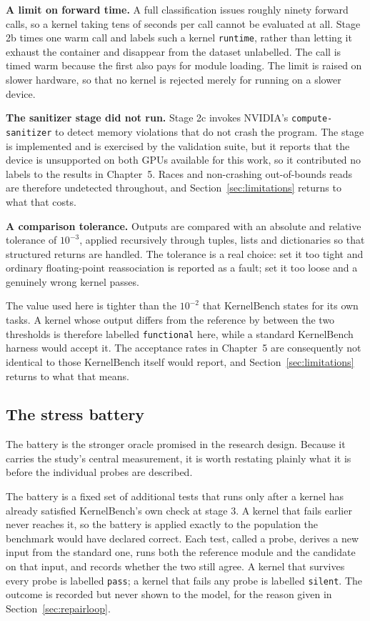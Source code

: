 \documentclass[12pt]{article}
\begin{document}
\textbf{A limit on forward time.} A full classification issues roughly ninety
forward calls, so a kernel taking tens of seconds per call cannot be evaluated
at all. Stage 2b times one warm call and labels such a kernel \texttt{runtime},
rather than letting it exhaust the container and disappear from the dataset
unlabelled. The call is timed warm because the first also pays for module
loading. The limit is raised on slower hardware, so that no kernel is rejected
merely for running on a slower device.

\textbf{The sanitizer stage did not run.} Stage 2c invokes NVIDIA's
\texttt{compute-sanitizer} to detect memory violations that do not crash the
program. The stage is implemented and is exercised by the validation suite, but
it reports that the device is unsupported on both GPUs available for this work,
so it contributed no labels to the results in Chapter~5. Races and non-crashing
out-of-bounds reads are therefore undetected throughout, and
Section~\ref{sec:limitations} returns to what that costs.

\textbf{A comparison tolerance.} Outputs are compared with an absolute and
relative tolerance of $10^{-3}$, applied recursively through tuples, lists and
dictionaries so that structured returns are handled. The tolerance is a real
choice: set it too tight and ordinary floating-point reassociation is reported
as a fault; set it too loose and a genuinely wrong kernel passes.

The value used here is tighter than the $10^{-2}$ that KernelBench states for
its own tasks. A kernel whose output differs from the reference by between the
two thresholds is therefore labelled \texttt{functional} here, while a standard
KernelBench harness would accept it. The acceptance rates in Chapter~5 are
consequently not identical to those KernelBench itself would report, and
Section~\ref{sec:limitations} returns to what that means.

\subsection{The stress battery}
\label{sec:battery}

The battery is the stronger oracle promised in the research design. Because it
carries the study's central measurement, it is worth restating plainly what it
is before the individual probes are described.

The battery is a fixed set of additional tests that runs only after a kernel has
already satisfied KernelBench's own check at stage 3. A kernel that fails
earlier never reaches it, so the battery is applied exactly to the population
the benchmark would have declared correct. Each test, called a probe, derives a
new input from the standard one, runs both the reference module and the
candidate on that input, and records whether the two still agree. A kernel that
survives every probe is labelled \texttt{pass}; a kernel that fails any probe is
labelled \texttt{silent}. The outcome is recorded but never shown to the model,
for the reason given in Section~\ref{sec:repairloop}.
\end{document}
